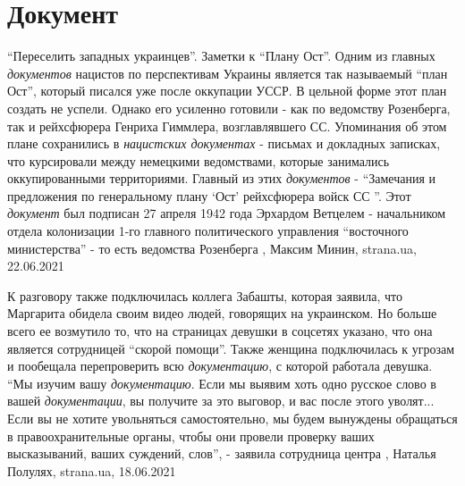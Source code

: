  
 
 
 
 
\chapter{Документ}

\enquote{Переселить западных украинцев}. Заметки к \enquote{Плану Ост}.  Одним
из главных \emph{документов} нацистов по перспективам Украины является так
называемый \enquote{план Ост}, который писался уже после оккупации УССР.  В
цельной форме этот план создать не успели. Однако его усиленно готовили - как
по ведомству Розенберга, так и рейхсфюрера Генриха Гиммлера, возглавлявшего СС.
Упоминания об этом плане сохранились в \emph{нацистских документах} - письмах и
докладных записках, что курсировали между немецкими ведомствами, которые
занимались оккупированными территориями.  Главный из этих \emph{документов} -
\enquote{Замечания и предложения по генеральному плану \enquote{Ост}
рейхсфюрера войск СС }. Этот \emph{документ} был подписан 27 апреля 1942 года
Эрхардом Ветцелем - начальником отдела колонизации 1-го главного политического
управления \enquote{восточного министерства} - то есть ведомства Розенберга
  , Максим Минин, strana.ua, 22.06.2021

К разговору также подключилась коллега Забашты, которая заявила, что Маргарита
обидела своим видео людей, говорящих на украинском. Но больше всего ее
возмутило то, что на страницах девушки в соцсетях указано, что она является
сотрудницей \enquote{скорой помощи}. Также женщина подключилась к угрозам и пообещала
перепроверить всю \emph{документацию}, с которой работала девушка.  \enquote{Мы изучим вашу
\emph{документацию}. Если мы выявим хоть одно русское слово в вашей \emph{документации}, вы
получите за это выговор, и вас после этого уволят... Если вы не хотите
увольняться самостоятельно, мы будем вынуждены обращаться в правоохранительные
органы, чтобы они провели проверку ваших высказываний, ваших суждений, слов}, -
заявила сотрудница центра 
,
Наталья Полулях, strana.ua, 18.06.2021
